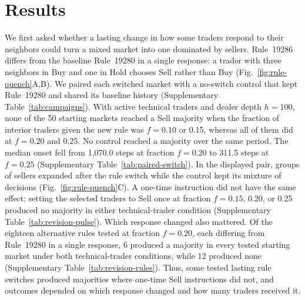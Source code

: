 \section{Results}

We first asked whether a lasting change in how some traders respond to
their neighbors could turn a mixed market into one dominated by sellers.
Rule~19286 differs from the baseline Rule~19280 in a single response:
a trader with three neighbors in Buy and one in Hold chooses Sell rather
than Buy (Fig.~\ref{fig:rule-quench}A,B). We paired each switched market
with a no-switch control that kept Rule~19280 and shared its baseline
history (Supplementary
Table~\ref{tab:campaigns}). With active technical traders and dealer
depth $h=100$, none of the 50 starting markets reached a Sell majority
when the fraction of interior traders given the new rule was $f=0.10$ or
0.15, whereas all of them did at $f=0.20$ and 0.25. No control
reached a majority over the same period. The median onset fell from
1,070.0 steps at fraction $f=0.20$ to 311.5 steps at $f=0.25$
(Supplementary Table~\ref{tab:paired-switch}). In the displayed pair,
groups of sellers expanded after the rule switch while the control kept
its mixture of decisions (Fig.~\ref{fig:rule-quench}C). A one-time
instruction did not have the same effect: setting the selected traders
to Sell once at fraction $f=0.15$, 0.20, or 0.25 produced no majority in either technical-trader condition
(Supplementary Table~\ref{tab:revision-pulse}). Which response changed
also mattered. Of the eighteen alternative rules tested at fraction
$f=0.20$, each differing from Rule~19280 in a single response,
6 produced a majority in every tested starting market under both technical-trader conditions, while 12 produced none (Supplementary Table~\ref{tab:revision-rules}). Thus,
some tested lasting rule switches produced majorities where one-time Sell
instructions did not, and outcomes depended on which response changed
and how many traders received it.

